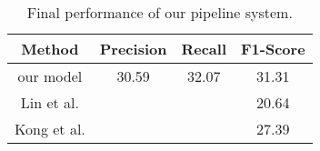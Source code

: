 \begin{table}[ht]
\centering
\begin{tabular}{|c|c|c|c|}
\hline

Method      &    Precision &     Recall &     F1-Score \\ \hline
our model   &    30.59     &     32.07  &     31.31    \\ \hline
Lin et al.  &              &            &     20.64    \\ \hline
Kong et al. &              &            &     27.39    \\ \hline


\end{tabular}
\caption{\label{t:final-results} Final performance of our pipeline system. }
\end{table}
